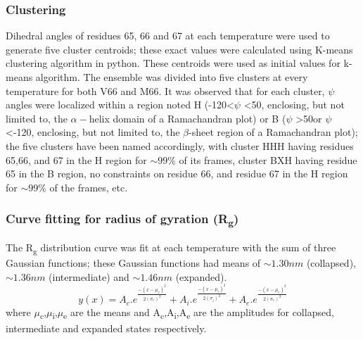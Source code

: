 \documentclass[10pt,letterpaper]{article}
\begin{document}
\subsubsection*{Clustering} Dihedral angles of residues 65, 66 and 67 at each temperature were used to generate five cluster centroids; these exact values were calculated using K-means clustering algorithm in python. These centroids were used as initial values for k-means algorithm. The ensemble was divided into five clusters at every temperature for both V66 and M66. It was observed that for each cluster, $\psi$ angles were localized within a region noted H (-120\textdegree\textless $\psi$ \textless 50\textdegree, enclosing, but not limited to, the $\alpha-$helix domain of a Ramachandran plot) or B  ($\psi$ \textgreater 50\textdegree or $\psi$ \textless -120\textdegree, enclosing, but not limited to, the $\beta$-sheet region of a Ramachandran plot); the five clusters have been named accordingly, with cluster HHH having residues 65,66, and 67 in the H region for $\sim 99\%$ of its frames, cluster BXH having residue 65 in the B region, no constraints on residue 66, and residue 67 in the H region for $\sim 99\%$ of the frames, etc.

\subsubsection*{Curve fitting for radius of gyration (R\textsubscript{g})} The R\textsubscript{g} distribution curve was fit at each temperature with the sum of three Gaussian functions; these Gaussian functions had means of $\sim1.30nm$ (collapsed), $\sim1.36nm$ (intermediate) and $\sim1.46nm$ (expanded).\begin{equation} y(x) =  A_c.e^{\frac{-(x-\mu_c)^2}{2(\sigma_c)^2}} + A_i.e^{\frac{-(x-\mu_i)^2}{2(\sigma_i)^2}} + A_e.e^{\frac{-(x-\mu_e)^2}{2(\sigma_e)^2}} \end{equation}  where $\mu$\textsubscript{c},$\mu$\textsubscript{i},$\mu$\textsubscript{e} are the means and A\textsubscript{c},A\textsubscript{i},A\textsubscript{e} are the amplitudes for collapsed, intermediate and expanded states respectively.
\end{document}
